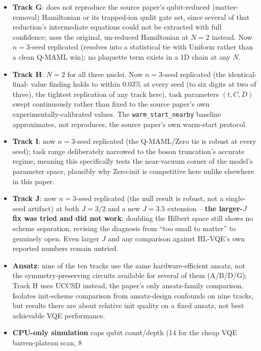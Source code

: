 \documentclass[11pt]{article}
\begin{document}
\begin{itemize}[nosep]
    paper's adaptive-VQE operator-selection approach; the stratified split is single-seed, not yet
    replicated at $n{=}3$.
    \item \textbf{Track G}: does not reproduce the source paper's qubit-reduced (matter-removal) Hamiltonian
    or its trapped-ion qudit gate set, since several of that reduction's intermediate equations could not
    be extracted with full confidence; uses the original, un-reduced Hamiltonian at $N{=}2$ instead. Now
    $n{=}3$-seed replicated (resolves into a statistical tie with Uniform rather than a clean Q-MAML win);
    no plaquette term exists in a 1D chain at any $N$.
    \item \textbf{Track H}: $N{=}2$ for all three nuclei. Now $n{=}3$-seed replicated (the identical-final-
    value finding holds to within 0.03\% at every seed (to six digits at two of three), the tightest replication of any track
    here), task parameters $(t,C,D)$ swept continuously rather than fixed to the source paper's own
    experimentally-calibrated values. The \texttt{warm\_start\_nearby} baseline approximates, not
    reproduces, the source paper's own warm-start protocol.
    \item \textbf{Track I}: now $n{=}3$-seed replicated (the Q-MAML/Zero tie is robust at every seed); task
    range deliberately narrowed to the boson truncation's accurate regime, meaning this specifically tests
    the near-vacuum corner of the model's parameter space, plausibly why Zero-init is competitive here
    unlike elsewhere in this paper.
    \item \textbf{Track J}: now $n{=}3$-seed replicated (the null result is robust, not a single-seed
    artifact) at both $J{=}3/2$ and a new $J{=}3.5$ extension -- \textbf{the larger-$J$ fix was tried and
    did not work}: doubling the Hilbert space still shows no scheme separation, revising the diagnosis from
    ``too small to matter'' to genuinely open. Even larger $J$ and any comparison against HL-VQE's own
    reported numbers remain untried.
    \item \textbf{Ansatz}: nine of the ten tracks use the same hardware-efficient ansatz, not the
    symmetry-preserving circuits available for several of them (A/B/D/G); Track H uses UCCSD instead,
    the paper's only ansatz-family comparison. Isolates init-scheme comparison from ansatz-design
    confounds on nine tracks, but results there are about relative init quality on a fixed ansatz, not
    best achievable VQE performance.
    \item \textbf{CPU-only simulation} caps qubit count/depth (14 for the cheap VQE barren-plateau scan, 8

\end{itemize}
\end{document}
